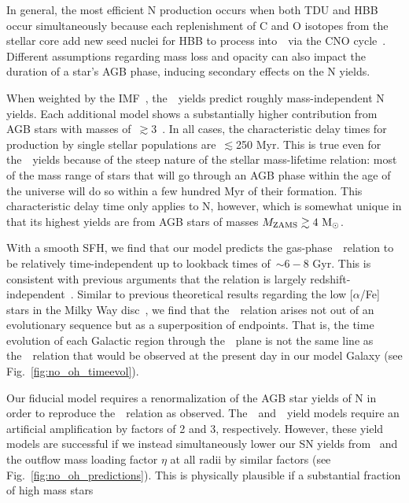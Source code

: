 \documentclass[ms.tex]{subfiles}
\begin{document}
In general, the most efficient N production occurs when both TDU and HBB
occur simultaneously because each replenishment of C and O isotopes from the
stellar core add new seed nuclei for HBB to process into~\Nfourteen~via the
CNO cycle~\citep{Ventura2013}.
Different assumptions regarding mass loss and opacity can also impact the
duration of a star's AGB phase, inducing secondary effects on the N yields.
\par
When weighted by the IMF~\citep{Kroupa2001}, the~\cristallo~yields predict
roughly mass-independent N yields.
Each additional model shows a substantially higher contribution from AGB stars
with masses of~$\gtrsim$3~\msun.
In all cases, the characteristic delay times for production by single stellar
populations are~$\lesssim$250 Myr.
This is true even for the~\cristallo~yields because of the steep nature of the
stellar mass-lifetime relation: most of the mass range of stars that will go
through an AGB phase within the age of the universe will do so within a few
hundred Myr of their formation.
This characteristic delay time only applies to N, however, which is somewhat
unique in that its highest yields are from AGB stars of masses
$M_\text{ZAMS} \gtrsim 4~\text{M}_\odot$.
\par
With a smooth SFH, we find that our model predicts the gas-phase~\ohno~relation
to be relatively time-independent up to lookback times of~$\sim6 - 8$ Gyr.
This is consistent with previous arguments that the relation is largely
redshift-independent~\citep{Vincenzo2018, HaydenPawson2021}.
Similar to previous theoretical results regarding the low [$\alpha$/Fe] stars
in the Milky Way disc~\citep[e.g.][]{Schoenrich2009, Sharma2021, Johnson2021},
we find that the~\ohno~relation arises not out of an evolutionary sequence but
as a superposition of endpoints.
That is, the time evolution of each Galactic region through the~\ohno~plane
is not the same line as the~\ohno~relation that would be observed at the
present day in our model Galaxy (see Fig.~\ref{fig:no_oh_timeevol}).
\par
Our fiducial model requires a renormalization of the AGB star yields of N in
order to reproduce the~\ohno~relation as observed.
The~\cristallo~and~\ventura~yield models require an artificial amplification by
factors of 2 and 3, respectively.
However, these yield models are successful if we instead simultaneously lower
our SN yields from~\citet{Johnson2021} and the outflow mass loading factor
$\eta$ at all radii by similar factors (see Fig.~\ref{fig:no_oh_predictions}).
This is physically plausible if a substantial fraction of high mass stars
\end{document}

